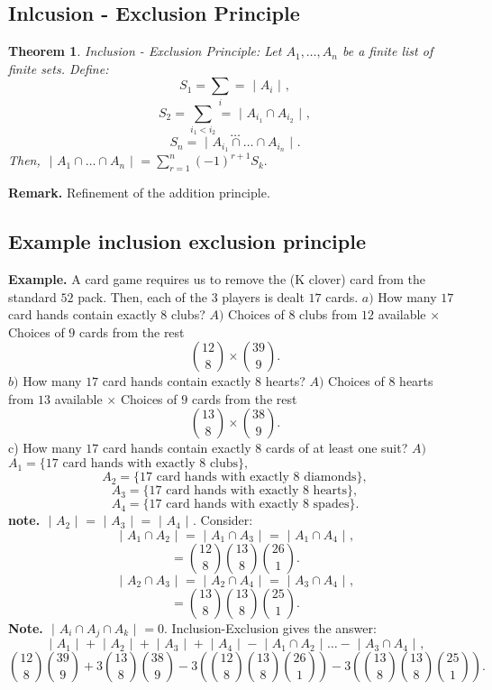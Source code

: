 \documentclass{article}
\newtheorem{theorem}{Theorem}                                       %
\begin{document}
\subsection{Inlcusion - Exclusion Principle}
\begin{theorem}
  Inclusion - Exclusion Principle:  Let $A_1, \dots, A_n$ be a finite 
  list of finite sets. Define:
  $$S_1 = \sum_{i} = \text{ | } A_i \text{ | },$$
  $$S_2 = \sum_{i_1 < i_2} = \text{ | } A_{i_1} \cap A_{i_2} \text{ | },$$
  $$ \dots $$
  $$S_n = \text{ | } A_{i_1} \cap \dots \cap A_{i_n} \text{ | }.$$
  \newline
  \newline
  Then, $\text{ | } A_1 \cap \dots \cap A_n \text{ | } = \sum_{r = 1}^{n} (-1)^{r + 1} S_k.$
\end{theorem}
\textbf{Remark. } Refinement of the addition principle. 
\newline
{}
\newpage
\subsection{Example inclusion exclusion principle}
\textbf{Example. } A card game requires us to remove
the (K clover) card from the standard $52$ pack. Then, 
each of the $3$ players is dealt $17$ cards.
\newline
\newline
$a) $ How many $17$ card hands contain exactly 
$8$ clubs?
\newline
$A) $ Choices of $8$ clubs from $12$ available $\times $ Choices of $9$ cards from the rest
$$ \binom{12}{8} \times \binom{39}{9}.$$
$b) $ How many $17$ card hands contain exactly $8$ hearts?
\newline
$A) $ Choices of $8$ hearts from $13$ available $\times $ Choices of $9$ cards from the rest
$$\binom{13}{8} \times \binom{38}{9}.$$
c) How many $17$ card hands contain exactly $8$ cards of at least one suit?
\newline
$A) $ $A_1 = \{17 \text{ card hands with exactly $8$ clubs} \},$
$$A_2 = \{17 \text{ card hands with exactly $8$ diamonds} \},$$
$$A_3 = \{17 \text{ card hands with exactly $8$ hearts} \},$$
$$A_4 = \{17 \text{ card hands with exactly $8$ spades} \}.$$
\textbf{note. } $\text{ | } A_2 \text{ | } = \text{ | } A_3 \text{ | } = \text{ | } A_4 \text{ | }.$
\newline
\newline
Consider:
$$\text{ | } A_1 \cap A_2 \text{ | } = \text{ | } A_1 \cap A_3 \text{ | } = \text{ | } A_1 \cap A_4 \text{ | },$$
$$ = \binom{12}{8} \binom{13}{8} \binom{26}{1}.$$
$$\text{ | } A_2 \cap A_3 \text{ | } = \text{ | } A_2 \cap A_4 \text{ | } = \text{ | } A_3 \cap A_4 \text{ | },$$
$$ = \binom{13}{8} \binom{13}{8} \binom{25}{1}.$$
\textbf{Note. } $\text{ | } A_i \cap A_j \cap A_k \text{ | } = 0.$
\newline
Inclusion-Exclusion gives the answer: 
$$\text{ | } A_1 \text{ | } + \text{ | } A_2 \text{ | } + \text{ | } A_3 \text{ | } + \text{ | } A_ 4 \text{ | } - \text{ | } A_1 \cap A_2 \text{ | } \dots - \text{ | } A_3 \cap A_4 \text{ | },$$
$$\binom{12}{8}\binom{39}{9} + 3\binom{13}{8}\binom{38}{9} - 3(\binom{12}{8} \binom{13}{8} \binom{26}{1}) - 3(\binom{13}{8} \binom{13}{8} \binom{25}{1}).$$
\newpage
\end{document}

